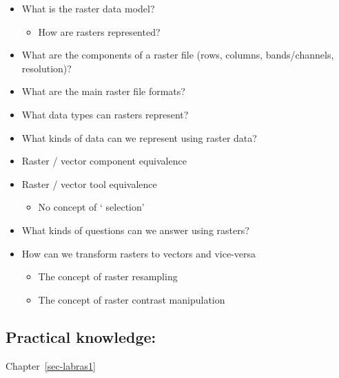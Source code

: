\documentclass[
  letterpaper,
  DIV=11,
  numbers=noendperiod]{scrreprt}
\providecommand{\tightlist}{%
  \setlength{\itemsep}{0pt}\setlength{\parskip}{0pt}}\usepackage{longtable,booktabs,array}
\begin{document}
\begin{itemize}
\tightlist
\item
  What is the raster data model?

  \begin{itemize}
  \tightlist
  \item
    How are rasters represented?
  \end{itemize}
\item
  What are the components of a raster file (rows, columns,
  bands/channels, resolution)?
\item
  What are the main raster file formats?
\item
  What data types can rasters represent?
\item
  What kinds of data can we represent using raster data?
\item
  Raster / vector component equivalence
\item
  Raster / vector tool equivalence

  \begin{itemize}
  \tightlist
  \item
    No concept of ` selection'
  \end{itemize}
\item
  What kinds of questions can we answer using rasters?
\item
  How can we transform rasters to vectors and vice-versa

  \begin{itemize}
  \tightlist
  \item
    The concept of raster resampling
  \item
    The concept of raster contrast manipulation
  \end{itemize}
\end{itemize}

\subsection*{Practical knowledge:}\label{practical-knowledge-2}

Chapter~\ref{sec-labras1}
\end{document}
